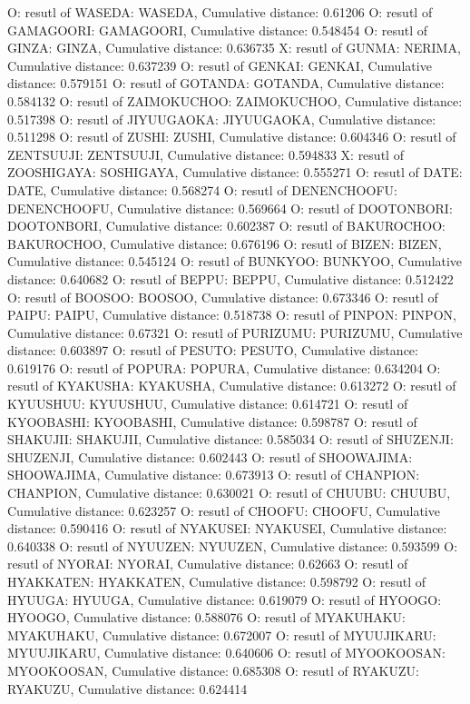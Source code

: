 O: resutl of WASEDA: WASEDA, Cumulative distance: 0.61206
O: resutl of GAMAGOORI: GAMAGOORI, Cumulative distance: 0.548454
O: resutl of GINZA: GINZA, Cumulative distance: 0.636735
X: resutl of GUNMA: NERIMA, Cumulative distance: 0.637239
O: resutl of GENKAI: GENKAI, Cumulative distance: 0.579151
O: resutl of GOTANDA: GOTANDA, Cumulative distance: 0.584132
O: resutl of ZAIMOKUCHOO: ZAIMOKUCHOO, Cumulative distance: 0.517398
O: resutl of JIYUUGAOKA: JIYUUGAOKA, Cumulative distance: 0.511298
O: resutl of ZUSHI: ZUSHI, Cumulative distance: 0.604346
O: resutl of ZENTSUUJI: ZENTSUUJI, Cumulative distance: 0.594833
X: resutl of ZOOSHIGAYA: SOSHIGAYA, Cumulative distance: 0.555271
O: resutl of DATE: DATE, Cumulative distance: 0.568274
O: resutl of DENENCHOOFU: DENENCHOOFU, Cumulative distance: 0.569664
O: resutl of DOOTONBORI: DOOTONBORI, Cumulative distance: 0.602387
O: resutl of BAKUROCHOO: BAKUROCHOO, Cumulative distance: 0.676196
O: resutl of BIZEN: BIZEN, Cumulative distance: 0.545124
O: resutl of BUNKYOO: BUNKYOO, Cumulative distance: 0.640682
O: resutl of BEPPU: BEPPU, Cumulative distance: 0.512422
O: resutl of BOOSOO: BOOSOO, Cumulative distance: 0.673346
O: resutl of PAIPU: PAIPU, Cumulative distance: 0.518738
O: resutl of PINPON: PINPON, Cumulative distance: 0.67321
O: resutl of PURIZUMU: PURIZUMU, Cumulative distance: 0.603897
O: resutl of PESUTO: PESUTO, Cumulative distance: 0.619176
O: resutl of POPURA: POPURA, Cumulative distance: 0.634204
O: resutl of KYAKUSHA: KYAKUSHA, Cumulative distance: 0.613272
O: resutl of KYUUSHUU: KYUUSHUU, Cumulative distance: 0.614721
O: resutl of KYOOBASHI: KYOOBASHI, Cumulative distance: 0.598787
O: resutl of SHAKUJII: SHAKUJII, Cumulative distance: 0.585034
O: resutl of SHUZENJI: SHUZENJI, Cumulative distance: 0.602443
O: resutl of SHOOWAJIMA: SHOOWAJIMA, Cumulative distance: 0.673913
O: resutl of CHANPION: CHANPION, Cumulative distance: 0.630021
O: resutl of CHUUBU: CHUUBU, Cumulative distance: 0.623257
O: resutl of CHOOFU: CHOOFU, Cumulative distance: 0.590416
O: resutl of NYAKUSEI: NYAKUSEI, Cumulative distance: 0.640338
O: resutl of NYUUZEN: NYUUZEN, Cumulative distance: 0.593599
O: resutl of NYORAI: NYORAI, Cumulative distance: 0.62663
O: resutl of HYAKKATEN: HYAKKATEN, Cumulative distance: 0.598792
O: resutl of HYUUGA: HYUUGA, Cumulative distance: 0.619079
O: resutl of HYOOGO: HYOOGO, Cumulative distance: 0.588076
O: resutl of MYAKUHAKU: MYAKUHAKU, Cumulative distance: 0.672007
O: resutl of MYUUJIKARU: MYUUJIKARU, Cumulative distance: 0.640606
O: resutl of MYOOKOOSAN: MYOOKOOSAN, Cumulative distance: 0.685308
O: resutl of RYAKUZU: RYAKUZU, Cumulative distance: 0.624414
